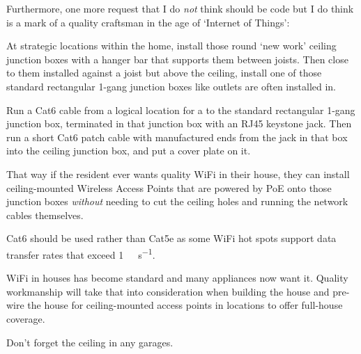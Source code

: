 Furthermore, one more request that I do \emph{not} think should be code but I do think is a mark of a quality
craftsman in the age of `Internet of Things':

At strategic locations within the home, install those round `new work' ceiling junction boxes with a hanger bar
that supports them between joists. Then close to them installed against a joist but above the ceiling, install
one of those standard rectangular 1-gang junction boxes like outlets are often installed in.

Run a Cat6 cable from a logical location for a  to the standard rectangular
1-gang junction box, terminated in that junction box with an RJ45 keystone jack. Then run a short Cat6 patch cable
with manufactured ends from the jack in that box into the ceiling junction box, and put a cover plate on it.

That way if the resident ever wants quality WiFi in their house, they can install ceiling-mounted Wireless Access
Points that are powered by PoE onto those junction boxes \emph{without} needing to cut the ceiling holes and running
the network cables themselves.

Cat6 should be used rather than Cat5e as some WiFi hot spots support data transfer rates that exceed
\qty{1}{\giga\bit\per\second}.

WiFi in houses has become standard and many appliances now want it. Quality workmanship will take that into
consideration when building the house and pre-wire the house for ceiling-mounted access points in locations
to offer full-house coverage.

Don't forget the ceiling in any garages.




































